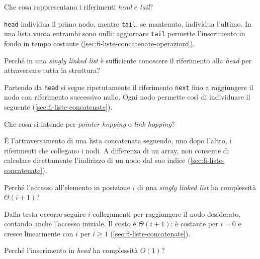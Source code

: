\begin{exercise}
\label{ex:fi-esercizi-strutture-dati-head-tail}
Che cosa rappresentano i riferimenti \emph{head} e \emph{tail}?
\end{exercise}

\texttt{head} individua il primo nodo, mentre \texttt{tail}, se mantenuto,
individua l'ultimo. In una lista vuota entrambi sono nulli; aggiornare
\texttt{tail} permette l'inserimento in fondo in tempo costante
(\cref{sec:fi-liste-concatenate-operazioni}).

\begin{exercise}
\label{ex:fi-esercizi-strutture-dati-head-attraversamento}
Perché in una \emph{singly linked list} è sufficiente conoscere il riferimento
alla \emph{head} per attraversare tutta la struttura?
\end{exercise}

Partendo da \texttt{head} si segue ripetutamente il riferimento \texttt{next}
fino a raggiungere il nodo con riferimento successivo nullo. Ogni nodo permette
così di individuare il seguente (\cref{sec:fi-liste-concatenate}).

\begin{exercise}
\label{ex:fi-esercizi-strutture-dati-link-hopping}
Che cosa si intende per \emph{pointer hopping} o \emph{link hopping}?
\end{exercise}

È l'attraversamento di una lista concatenata seguendo, uno dopo l'altro, i
riferimenti che collegano i nodi. A differenza di un array, non consente di
calcolare direttamente l'indirizzo di un nodo dal suo indice
(\cref{sec:fi-liste-concatenate}).

\begin{exercise}
\label{ex:fi-esercizi-strutture-dati-linked-accesso-indice}
Perché l'accesso all'elemento in posizione \(i\) di una \emph{singly linked
list} ha complessità \(\Theta(i+1)\)?
\end{exercise}

Dalla testa occorre seguire \(i\) collegamenti per raggiungere il nodo
desiderato, contando anche l'accesso iniziale. Il costo è
\(\Theta(i+1)\): è costante per \(i=0\) e cresce linearmente con
\(i\) per \(i\ge1\)
(\cref{sec:fi-liste-concatenate}).

\begin{exercise}
\label{ex:fi-esercizi-strutture-dati-inserimento-head}
Perché l'inserimento in \emph{head} ha complessità \(O(1)\)?
\end{exercise}

